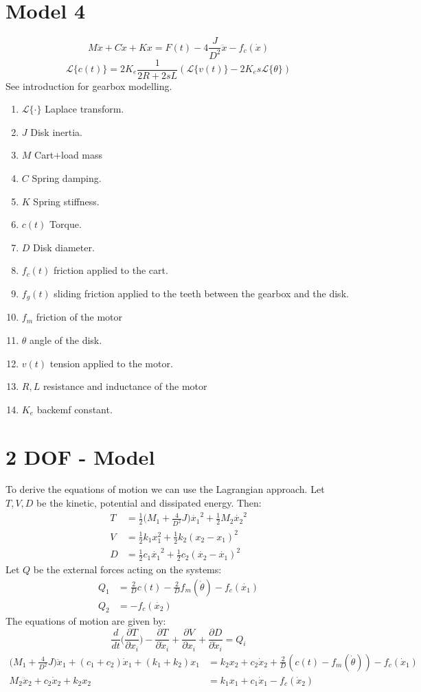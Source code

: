 \documentclass[10pt,a4paper]{report}
\begin{document}
\section{Model 4 }
$$M\ddot{x} + C\dot{x}+Kx = F(t) - 4\frac{J}{D^2}\ddot{x}- f_c(\dot{x})$$
$$\mathcal{L}\{c(t)\} = 2K_e \frac{1}{2R+2sL} (\mathcal{L}\{ v(t)\}-2K_e s \mathcal{L}\{\theta \})$$
See introduction for gearbox modelling.
\begin{enumerate}
\item $\mathcal{L}\{\cdot \}$ Laplace transform.
\item $J$ Disk inertia.
\item $M$ Cart+load mass
\item $C$ Spring damping.
\item $K$ Spring stiffness.
\item $c(t)$ Torque.
\item $D$ Disk diameter.
\item $f_c(t)$ friction applied to the cart.
\item $f_g(t)$ sliding friction applied to the teeth between the gearbox and the disk.
\item $f_m$ friction of the motor
\item $\theta$ angle of the disk.
\item $v(t)$ tension applied to the motor.
\item $R,L$ resistance and inductance of the motor
\item $K_e$ backemf constant.

\end{enumerate}

\section{2 DOF - Model}
To derive the equations of motion we can use the Lagrangian approach. Let $T,V,D$ be the kinetic, potential and dissipated energy. Then:
\begin{align*}
T  &= \frac{1}{2} \Big(M_1 + \frac{4}{D^2}J \Big) \dot{x_1}^2 + \frac{1}{2}M_2 \dot{x_2}^2 \\
V &= \frac{1}{2}k_1x_1^2 + \frac{1}{2}k_2(x_2-x_1)^2 \\
D &= \frac{1}{2}c_1\dot{x_1}^2 + \frac{1}{2}c_2(\dot{x_2}-\dot{x_1})^2
\end{align*}
Let $Q$ be the external forces acting on the systems:
\begin{align*}
Q_1 &= \frac{2}{D}c(t) - \frac{2}{D}f_m(\dot{\theta}) - f_c(\dot{x_1}) \\
Q_2 &=  - f_c(\dot{x_2})
\end{align*}
The equations of motion are given by:
$$\frac{d}{dt}\Big(\frac{\partial T}{\partial x_i} \Big) -\frac{\partial T}{\partial \dot{x}_i} + \frac{\partial V}{\partial x_i} + \frac{\partial D}{\partial \dot{x}_i} = Q_i$$
\begin{align*}
\Big(M_1+\frac{4}{D^2}J \Big)\ddot{x}_1+(c_1+c_2)\dot{x}_1 +(k_1+k_2)x_1 &= k_2 x_2 +c_2 \dot{x}_2 + \frac{2}{D}(c(t)-f_m(\dot{\theta}))-f_c(\dot{x}_1) \\
M_2 \ddot{x}_2 +c_2 \dot{x}_2 +k_2x_2 &= k_1x_1+c_1\dot{x}_1 -f_c(\dot{x}_2)
\end{align*}
\end{document}
